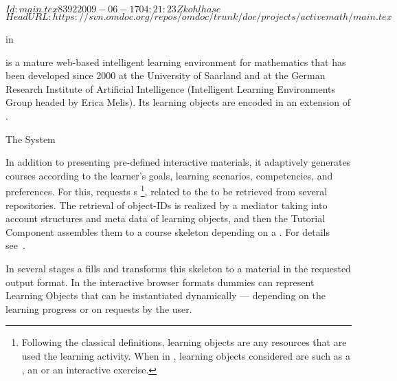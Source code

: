 \svnInfo $Id: main.tex 8392 2009-06-17 04:21:23Z kohlhase $
\svnKeyword $HeadURL: https://svn.omdoc.org/repos/omdoc/trunk/doc/projects/activemath/main.tex $

\begin{omgroup}[id=activemath,short=ActiveMath,
  creators={melis,goguadse,alberto,frischauf,homik,libbrecht,cullrich}]
  {{\omdoc} in {\activemath}}

{\activemath} is a mature web-based intelligent learning environment for mathematics that
has been developed since 2000 at the University of Saarland and at the German Research
Institute of Artificial Intelligence (Intelligent Learning Environments Group headed by
Erica Melis). Its learning objects are encoded in an extension of {\omdoc}.

\begin{omgroup}{The {\activemath} System}

In addition to presenting pre-defined interactive materials, it adaptively generates
courses according to the learner's goals, learning scenarios, competencies, and
preferences. For this, {} requests
{s} \footnote{Following the classical definitions, learning
  objects are any resources that are used the learning activity. When in {\omdoc},
  learning objects considered are such as a , an  or
  an interactive exercise.}, related to the {} to be retrieved
from several repositories.  The retrieval of object-IDs is realized by a mediator taking
into account structures and meta data of learning objects, and then the Tutorial Component
assembles them to a course skeleton depending on a {}.  For
details
see~\cite{Ullrich-TutorialPlanningYRT-AIED-2005,Ullrich-InstructionalOntology-ISWC-2004}.

In several stages a {} fills and transforms this skeleton
to a material in the requested output format. In the interactive browser formats dummies
can represent Learning Objects that can be instantiated dynamically ---
depending on the learning progress or on requests by the user.


\end{omgroup}
\end{omgroup}
